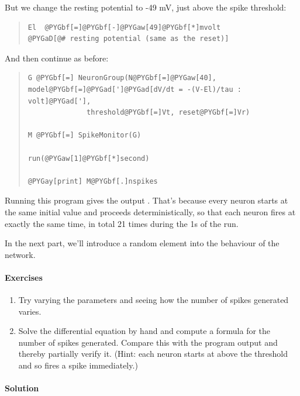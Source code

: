 \documentclass[letterpaper,10pt,english]{manual}
\begin{document}
But we change the resting potential to -49 mV, just above the
spike threshold:
\begin{quote}

\begin{Verbatim}[commandchars=@\[\]]
El  @PYGbf[=]@PYGbf[-]@PYGaw[49]@PYGbf[*]mvolt          @PYGaD[@# resting potential (same as the reset)]
\end{Verbatim}
\end{quote}

And then continue as before:
\begin{quote}

\begin{Verbatim}[commandchars=@\[\]]
G @PYGbf[=] NeuronGroup(N@PYGbf[=]@PYGaw[40], model@PYGbf[=]@PYGad[']@PYGad[dV/dt = -(V-El)/tau : volt]@PYGad['],
              threshold@PYGbf[=]Vt, reset@PYGbf[=]Vr)

M @PYGbf[=] SpikeMonitor(G)

run(@PYGaw[1]@PYGbf[*]second)

@PYGay[print] M@PYGbf[.]nspikes
\end{Verbatim}
\end{quote}

Running this program gives the output . That's because
every neuron starts at the same initial value and proceeds
deterministically, so that each neuron fires at exactly the
same time, in total 21 times during the 1s of the run.

In the next part, we'll introduce a random element into the
behaviour of the network.


\paragraph{Exercises}
\begin{enumerate}
\item {} 
Try varying the parameters and seeing how the number of
spikes generated varies.

\item {} 
Solve the differential equation by hand and compute a
formula for the number of spikes generated. Compare this
with the program output and thereby partially verify it.
(Hint: each neuron starts at above the threshold and so
fires a spike immediately.)

\end{enumerate}


\paragraph{Solution}
\end{document}
